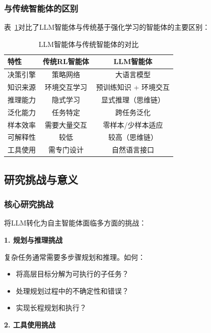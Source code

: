 \subsubsection{与传统智能体的区别}

表~\ref{tab:agent_comparison}对比了LLM智能体与传统基于强化学习的智能体的主要区别：

\begin{table}[htbp]
    \centering
    \caption{LLM智能体与传统智能体的对比}\label{tab:agent_comparison}
    \begin{tabular}{@{}lcc@{}}
        \toprule
        \textbf{特性} & \textbf{传统RL智能体} & \textbf{LLM智能体} \\
        \midrule
        决策引擎 & 策略网络 & 大语言模型 \\
        知识来源 & 环境交互学习 & 预训练知识 + 环境交互 \\
        推理能力 & 隐式学习 & 显式推理（思维链） \\
        泛化能力 & 任务特定 & 跨任务泛化 \\
        样本效率 & 需要大量交互 & 零样本/少样本适应 \\
        可解释性 & 较低 & 较高（思维链） \\
        工具使用 & 需专门设计 & 自然语言接口 \\
        \bottomrule
    \end{tabular}
\end{table}

\subsection{研究挑战与意义}

\subsubsection{核心研究挑战}

将LLM转化为自主智能体面临多方面的挑战：

\textbf{1. 规划与推理挑战}

复杂任务通常需要多步骤规划和推理。如何：
\begin{itemize}
    \item 将高层目标分解为可执行的子任务？
    \item 处理规划过程中的不确定性和错误？
    \item 实现长程规划和执行？
\end{itemize}

\textbf{2. 工具使用挑战}

